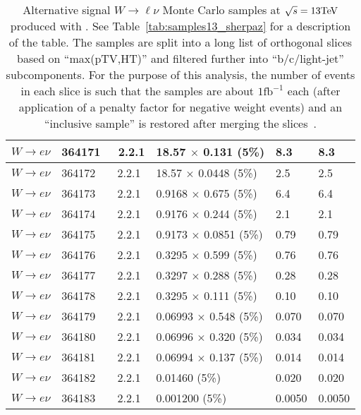 \begin{table}[htbp]
\begin{center}
\begin{tabular}{l|l|l|l|l|l}
    			$ W \to e\nu $ & 364171 & \Sherpa\ 2.2.1 & 18.57 $\times$ 0.131 (5\%)  & 8.3 & 8.3 \\\hline
    			$ W \to e\nu $ & 364172 & \Sherpa\ 2.2.1 & 18.57 $\times$ 0.0448 (5\%)  & 2.5 & 2.5 \\\hline
    			$ W \to e\nu $ & 364173 & \Sherpa\ 2.2.1 & 0.9168 $\times$ 0.675 (5\%)  & 6.4 & 6.4 \\\hline
    			$ W \to e\nu $ & 364174 & \Sherpa\ 2.2.1 & 0.9176 $\times$ 0.244 (5\%)  & 2.1 & 2.1 \\\hline
    			$ W \to e\nu $ & 364175 & \Sherpa\ 2.2.1 & 0.9173 $\times$ 0.0851 (5\%)  & 0.79 & 0.79 \\\hline
    			$ W \to e\nu $ & 364176 & \Sherpa\ 2.2.1 & 0.3295 $\times$ 0.599 (5\%)  & 0.76 & 0.76 \\\hline
    			$ W \to e\nu $ & 364177 & \Sherpa\ 2.2.1 & 0.3297 $\times$ 0.288 (5\%)  & 0.28 & 0.28 \\\hline
    			$ W \to e\nu $ & 364178 & \Sherpa\ 2.2.1 & 0.3295 $\times$ 0.111 (5\%)  & 0.10 & 0.10 \\\hline
    			$ W \to e\nu $ & 364179 & \Sherpa\ 2.2.1 & 0.06993 $\times$ 0.548 (5\%)  & 0.070 & 0.070 \\\hline
    			$ W \to e\nu $ & 364180 & \Sherpa\ 2.2.1 & 0.06996 $\times$ 0.320 (5\%)  & 0.034 & 0.034 \\\hline
    			$ W \to e\nu $ & 364181 & \Sherpa\ 2.2.1 & 0.06994 $\times$ 0.137 (5\%)  & 0.014 & 0.014 \\\hline
    			$ W \to e\nu $ & 364182 & \Sherpa\ 2.2.1 & 0.01460 (5\%)  & 0.020 & 0.020 \\\hline
    			$ W \to e\nu $ & 364183 & \Sherpa\ 2.2.1 & 0.001200 (5\%)  & 0.0050 & 0.0050 \\\hline
    		\end{tabular}
    		\caption{Alternative signal $W\to\ell\nu$ Monte Carlo samples at
    			$\sqrt{s} = 13\text{Te\kern -0.1em V}$ produced with \Sherpa. See Table~\ref{tab:samples13_sherpaz}
    			for a description of the table. The samples are split
    			into a long list of orthogonal slices based on ``max(pTV,HT)''
    			and filtered further into ``b/c/light-jet'' subcomponents.  For
    			the purpose of this analysis, the number of events in each slice
    			is such that the samples are about $1\mathrm{fb}^{-1}$ each (after application
    			of a penalty factor for negative weight events) and
    			an ``inclusive sample'' is restored after merging the slices~\cite{int_note_samples}.}
    		\label{tab:samples13_sherpaw}
    	\end{center}
    \end{table}
    
